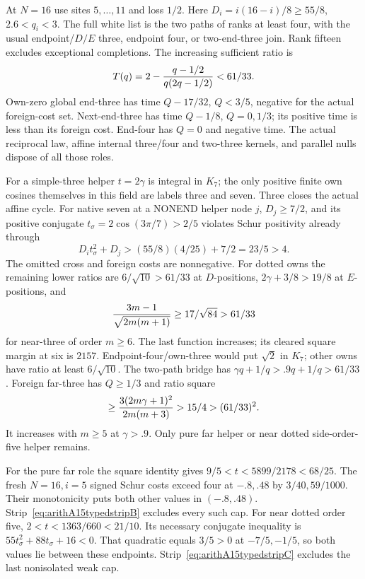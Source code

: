 At \(N=16\) use sites \(5,\ldots,11\)
and loss \(1/2\).
Here \(D_i=i(16-i)/8\ge55/8\), \(2.6<q_i<3\).
The full white list is the two paths
of ranks at least four, with the usual
endpoint/\(D/E\) three, endpoint four,
or two-end-three join.
Rank fifteen excludes exceptional completions.
The increasing sufficient ratio is
\[
             T(q)=2-{q-1/2\over q(2q-1/2)}<61/33 .
\]
Own-zero global end-three has time
\(Q-17/32\), \(Q<3/5\), negative for
the actual foreign-cost set.
Next-end-three has time \(Q-1/8\),
\(Q=0,1/3\); its positive time is
less than its foreign cost.
End-four has \(Q=0\) and negative time.
The actual reciprocal law, affine internal
three/four and two-three kernels, and
parallel nulls dispose of all those roles.

For a simple-three helper \(t=2\gamma\)
is integral in \(K_7\); the only positive
finite own cosines themselves in this
field are labels three and seven.
Three closes the actual affine cycle.
For native seven at a NONEND helper node
\(j\), \(D_j\ge7/2\), and its positive
conjugate \(t_\sigma=2\cos(3\pi/7)>2/5\)
violates Schur positivity already through
\[
                 D_it_\sigma^2+D_j>
                       (55/8)(4/25)+7/2=23/5>4 .
\]
The omitted cross and foreign costs are
nonnegative.
For dotted owns the remaining lower
ratios are \(6/\sqrt{10}>61/33\) at
\(D\)-positions, \(2\gamma+3/8>19/8\)
at \(E\)-positions, and
\[
 {3m-1\over\sqrt{2m(m+1)}}\ge17/\sqrt{84}>61/33
\]
for near-three of order \(m\ge6\).
The last function increases; its cleared
square margin at six is \(2157\).
Endpoint-four/own-three would put
\(\sqrt2\) in \(K_7\); other owns have
ratio at least \(6/\sqrt{10}\).
The two-path bridge has
\(\gamma q+1/q>.9q+1/q>61/33\).
Foreign far-three has \(Q\ge1/3\)
and ratio square
\[
          \ge{3(2m\gamma+1)^2\over2m(m+3)}
                         >15/4>(61/33)^2 .
\]
It increases with \(m\ge5\) at \(\gamma>.9\).
Only pure far helper or near dotted
side-order-five helper remains.

For the pure far role the square identity
gives \(9/5<t<5899/2178<68/25\).
The fresh \(N=16,i=5\) signed Schur
costs exceed four at \(-.8,.48\)
by \(3/40,59/1000\).
Their monotonicity puts both other values
in \((-.8,.48)\).
Strip~\eqref{eq:arithA15typedstripB}
excludes every such cap.
For near dotted order five,
\(2<t<1363/660<21/10\).
Its necessary conjugate inequality is
\(55t_\sigma^2+88t_\sigma+16<0\).
That quadratic equals \(3/5>0\) at
\(-7/5,-1/5\), so both values lie
between these endpoints.
Strip~\eqref{eq:arithA15typedstripC}
excludes the last nonisolated weak cap.


